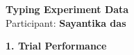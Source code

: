 \documentclass[10pt,a4paper]{article}
\begin{document}

\begin{center}
    {\Large\bfseries Typing Experiment Data}\\
    \vspace{2pt}
    Participant: \textbf{Sayantika das}
\end{center}

\vspace{0.25cm}


\noindent
{\large\bfseries 1. Trial Performance}

\vspace{0.08cm}
\end{document}
